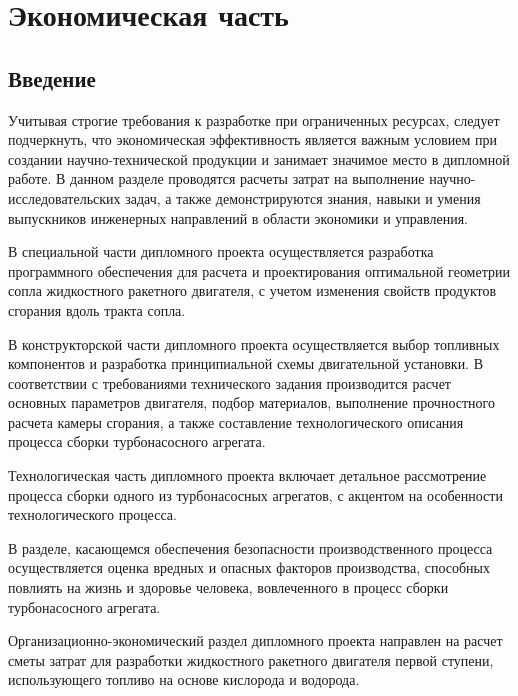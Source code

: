 \section{Экономическая часть}
\subsection{Введение}

Учитывая строгие требования к разработке при ограниченных ресурсах, следует
подчеркнуть, что экономическая эффективность является важным условием при создании
научно-технической продукции и занимает значимое место в дипломной работе. В данном
разделе проводятся расчеты затрат на выполнение научно-исследовательских задач, а
также демонстрируются знания, навыки и умения выпускников инженерных направлений в
области экономики и управления.

В специальной части дипломного проекта осуществляется разработка программного
обеспечения для расчета и проектирования оптимальной геометрии сопла жидкостного
ракетного двигателя, с учетом изменения свойств продуктов сгорания вдоль тракта сопла.

В конструкторской части дипломного проекта осуществляется выбор топливных компонентов
и разработка принципиальной схемы двигательной установки. В соответствии с
требованиями технического задания производится расчет основных параметров двигателя,
подбор материалов, выполнение прочностного расчета камеры сгорания, а также
составление технологического описания процесса сборки турбонасосного агрегата.

Технологическая часть дипломного проекта включает детальное рассмотрение процесса
сборки одного из турбонасосных агрегатов, с акцентом на особенности технологического
процесса.

В разделе, касающемся обеспечения безопасности производственного процесса
осуществляется оценка вредных и опасных факторов производства, способных повлиять на
жизнь и здоровье человека, вовлеченного в процесс сборки турбонасосного агрегата.

Организационно-экономический раздел дипломного проекта направлен на расчет сметы
затрат для разработки жидкостного ракетного двигателя первой ступени, использующего
топливо на основе кислорода и водорода.

